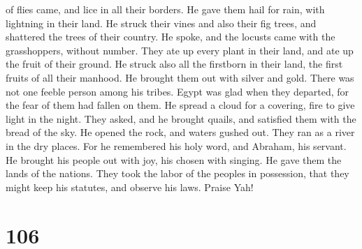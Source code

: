 of flies came, and lice in all their borders.  He gave
them hail for rain, with lightning in their land.  He
struck their vines and also their fig trees, and shattered the trees of
their country.  He spoke, and the locusts came with the
grasshoppers, without number.  They ate up every plant in
their land, and ate up the fruit of their ground.  He
struck also all the firstborn in their land, the first fruits of all
their manhood.  He brought them out with silver and gold.
There was not one feeble person among his tribes.  Egypt
was glad when they departed, for the fear of them had fallen on them.
 He spread a cloud for a covering, fire to give light in
the night.  They asked, and he brought quails, and
satisfied them with the bread of the sky.  He opened the
rock, and waters gushed out. They ran as a river in the dry places.
 For he remembered his holy word, and Abraham, his
servant.  He brought his people out with joy, his chosen
with singing.  He gave them the lands of the nations.
They took the labor of the peoples in possession,  that
they might keep his statutes, and observe his laws. Praise Yah!

\hypertarget{section-105}{%
\section{106}\label{section-105}}

